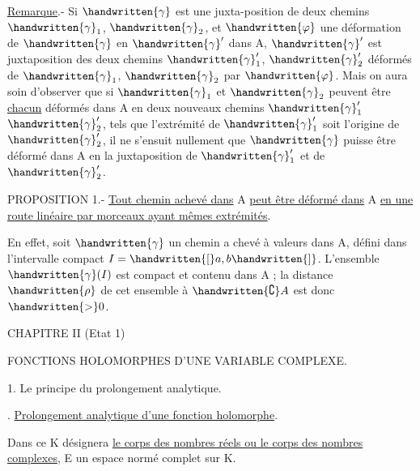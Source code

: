 \uline{Remarque}.- Si $\handwritten{\gamma}$ est une juxta-position de deux chemins $\handwritten{\gamma}_1$, $\handwritten{\gamma}_2$, et $\handwritten{\varphi}$ une déformation de $\handwritten{\gamma}$ en $\handwritten{\gamma}'$ dans A, $\handwritten{\gamma}'$ est juxtaposition des deux chemins $\handwritten{\gamma}'_1$, $\handwritten{\gamma}'_2$ déformés de $\handwritten{\gamma}_1$, $\handwritten{\gamma}_2$ par $\handwritten{\varphi}$. Mais on aura soin d'observer que si $\handwritten{\gamma}_1$ et $\handwritten{\gamma}_2$ peuvent être \uline{chacun} déformés dans A en deux nouveaux chemins $\handwritten{\gamma}'_1$\unsure{,|} $\handwritten{\gamma}'_2$, tels que l'extrémité de $\handwritten{\gamma}'_1$ soit l'origine de $\handwritten{\gamma}'_2$, il ne s'ensuit nullement que $\handwritten{\gamma}$ puisse être déformé dans A en la juxtaposition de $\handwritten{\gamma}'_1$ et de $\handwritten{\gamma}'_2$.

PROPOSITION 1.- \uline{Tout chemin achevé dans} A \uline{peut être déformé dans} A \uline{en une route linéaire par morceaux ayant mêmes extrémités}.

En effet, soit $\handwritten{\gamma}$ un chemin a chevé à valeurs dans A, défini dans l'intervalle compact $I=\handwritten{[}a,b\handwritten{]}$. L'ensemble $\handwritten{\gamma}(I)$ est compact et contenu dans A ; la distance $\handwritten{\rho}$ de cet ensemble à $\handwritten{\complement}A$ est donc $\handwritten{>}0$.



\begin{center}
CHAPITRE II (Etat 1)

FONCTIONS HOLOMORPHES D'UNE VARIABLE COMPLEXE.

\handwritten{\S}1. Le principe du prolongement analytique.
\end{center}

\uline{}. \uline{Prolongement analytique d'une fonction holomorphe}.

Dans ce \handwritten{\S}\unsure{,|;} K désignera \uline{le corps des nombres réels ou le corps des nombres complexes}, E un espace normé complet sur K.

